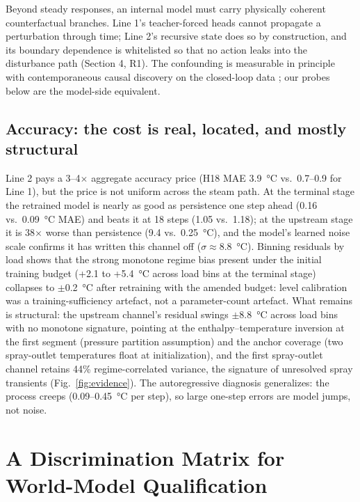 \documentclass{article}
\begin{document}
Beyond steady responses, an internal model must carry physically coherent counterfactual
branches. Line 1's teacher-forced heads cannot propagate a perturbation through time;
Line 2's recursive state does so by construction, and its boundary dependence is
whitelisted so that no action leaks into the disturbance path (Section 4, R1). The
confounding is measurable in principle with contemporaneous causal discovery on the
closed-loop data \cite{runge2020pcmci}; our probes below are the model-side equivalent.

\subsection{Accuracy: the cost is real, located, and mostly structural}

Line 2 pays a 3--4$\times$ aggregate accuracy price (H18 MAE
3.9~\si{\degreeCelsius} vs.\ 0.7--0.9 for Line 1), but the price is not uniform
across the steam path. At the terminal stage the retrained model is nearly as good
as persistence one step ahead (0.16 vs.\ 0.09~\si{\degreeCelsius} MAE) and beats it
at 18 steps (1.05 vs.\ 1.18); at the upstream stage it is 38$\times$ worse than
persistence (9.4 vs.\ 0.25~\si{\degreeCelsius}), and the model's learned noise scale
confirms it has written this channel off ($\sigma \approx 8.8$~\si{\degreeCelsius}).
Binning residuals by load shows that the strong monotone regime bias present under
the initial training budget (+2.1 to +5.4~\si{\degreeCelsius} across load bins at the
terminal stage) collapses to $\pm$0.2~\si{\degreeCelsius} after retraining with the
amended budget: level calibration was a training-sufficiency artefact, not a
parameter-count artefact. What remains is structural: the upstream channel's
residual swings $\pm$8.8~\si{\degreeCelsius} across load bins with no monotone
signature, pointing at the enthalpy--temperature inversion at the first segment
(pressure partition assumption) and the anchor coverage (two spray-outlet
temperatures float at initialization), and the first spray-outlet channel retains
44\% regime-correlated variance, the signature of unresolved spray transients
(Fig.~\ref{fig:evidence}). The autoregressive diagnosis generalizes: the process
creeps (0.09--0.45~\si{\degreeCelsius} per step), so large one-step errors are model
jumps, not noise.

\section{A Discrimination Matrix for World-Model Qualification}
\end{document}
